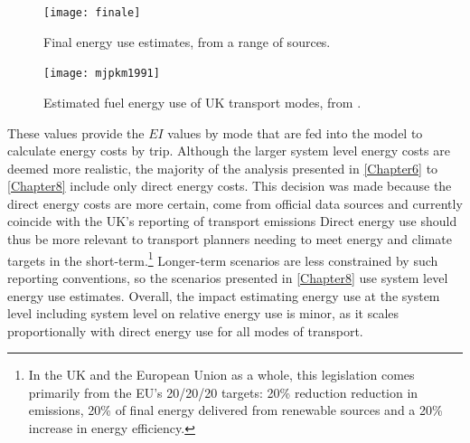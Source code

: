 \begin{figure}[h]
 \centering
 \texttt{[image: finale]}
 \caption{Final energy use estimates, from a range of sources.}
 \label{ffinale}
\end{figure}

\begin{figure}[h]
 \centering
 \texttt{[image: mjpkm1991]}
 \caption[Fuel energy use of UK transport modes, 1991]
 {Estimated fuel energy use of UK transport modes, from \citet{Hughes1991149}.}
 \label{fmjpkm1991}
\end{figure}

These values provide the $EI$ values by mode that are fed into the model
to calculate energy costs by trip. Although the larger system level energy costs
are deemed more realistic, the majority of the analysis presented in \cref{Chapter6}
to \cref{Chapter8} include only direct energy costs. This decision was made
because the direct energy costs are more certain, come from official data sources and
currently coincide with the UK's reporting of transport emissions
Direct energy use should thus be more relevant to transport planners needing to meet energy and climate
targets in the short-term.\footnote{In
the UK and the European Union as a whole, this legislation
comes primarily from the EU's 20/20/20 targets: 20\% reduction reduction
in emissions, 20\% of final energy delivered from renewable sources and
a 20\% increase in energy efficiency.
}
Longer-term scenarios 
are less constrained by such reporting conventions, so the scenarios
presented in \cref{Chapter8} use system level energy use estimates.
Overall, the impact estimating energy use at the system level
including system level on relative energy use is minor, as it scales
proportionally with direct energy use for all modes of transport.


